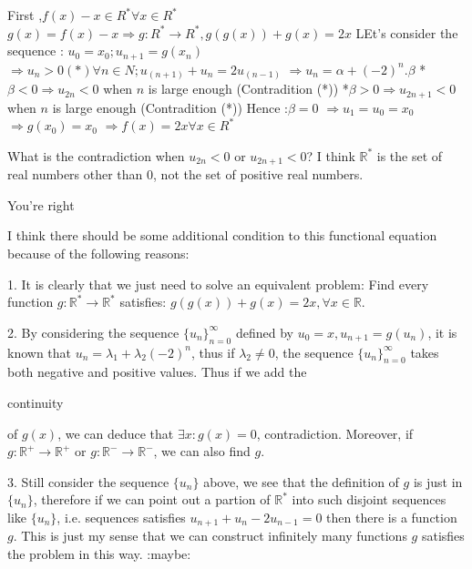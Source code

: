 \begin{solution}
	\begin{tcolorbox}First ,$ f(x) - x \in R^* \forall x \in R^*$
$ g(x) = f(x) - x \Rightarrow g: R^* \rightarrow R^* , g(g(x)) + g(x) = 2x$
LEt's consider the sequence :  $ u_0 = x_0; u_{n + 1} = g(x_n)$
$ \Rightarrow u_n > 0 (*) \forall n \in N ; u_(n + 1) + u_n = 2u_(n - 1)$
$ \Rightarrow u_n = \alpha + ( - 2)^n .\beta$
* $ \beta < 0 \Rightarrow u_{2n} < 0$ when $ n$ is large enough (Contradition (*))
*$ \beta > 0\Rightarrow u_{2n + 1} < 0$ when $ n$ is large enough (Contradition (*))
Hence :$ \beta = 0$
$ \Rightarrow u_1 = u_0 = x_0$
$ \Rightarrow g(x_0) = x_0$
$ \Rightarrow f(x) = 2x \forall x \in R^*$\end{tcolorbox}

What is the contradiction when ${ u_{2n}<0}$ or $ u_{2n+1}<0$? I think $ \mathbb{R}^*$ is the set of real numbers other than $ 0$, not the set of positive real numbers.
\end{solution}



\begin{solution}
	You're right
\end{solution}



\begin{solution}
	I think there should be some additional condition to this functional equation because of the following reasons:

1. It is clearly that we just need to solve an equivalent problem:
Find every function $ g: \mathbb{R}^*\to\mathbb{R}^*$ satisfies: $ g(g(x)) + g(x) = 2x,\forall x\in\mathbb{R}$.

2. By considering the sequence $ \{u_n\}_{n=0}^{\infty}$ defined by $ u_0 = x, u_{n+1} =g(u_n)$, it is known that $ u_n = \lambda_1 + \lambda_2 (-2)^n$, thus if $ \lambda_2\neq 0$, the sequence $ \{u_n\}_{n=0}^{\infty}$ takes both negative and positive values. Thus if we add the \begin{italicized}continuity\end{italicized} of $ g(x)$, we can deduce that $ \exists x: g(x)=0$, contradiction. Moreover, if $ g: \mathbb{R}^+\to\mathbb{R}^+$ or $ g: \mathbb{R}^- \to \mathbb{R}^-$, we can also find $ g$.

3. Still consider the sequence $ \{u_n\}$ above, we see that the definition of $ g$ is just in $ \{u_n\}$, therefore if we can point out a partion of $ \mathbb{R}^*$ into such disjoint sequences like $ \{u_n\}$, i.e. sequences satisfies $ u_{n+1} + u_n - 2u_{n-1} = 0$ then there is a function $ g$. This is just my sense that we can construct infinitely many functions $ g$ satisfies the problem in this way. :maybe:
\end{solution}



